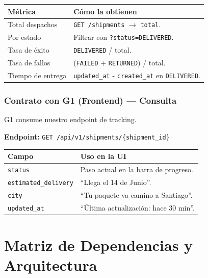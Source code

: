 \documentclass[11pt, a4paper]{article}
\begin{document}
\begin{table}[h!]
\centering
\renewcommand{\arraystretch}{1.3}
\begin{tabularx}{\textwidth}{l X}
  \toprule
  \textbf{Métrica} & \textbf{Cómo la obtienen} \\
  \midrule
  Total despachos       & \texttt{GET /shipments} $\rightarrow$ \texttt{total}. \\
  Por estado            & Filtrar con \texttt{?status=DELIVERED}. \\
  Tasa de éxito         & \texttt{DELIVERED} / total. \\
  Tasa de fallos        & (\texttt{FAILED} + \texttt{RETURNED}) / total. \\
  Tiempo de entrega     & \texttt{updated\_at} - \texttt{created\_at} en \texttt{DELIVERED}. \\
  \bottomrule
\end{tabularx}
\end{table}


\section{Contrato con G1 (Frontend) --- Consulta}

G1 consume nuestro endpoint de tracking.

\textbf{Endpoint:} \texttt{GET /api/v1/shipments/\{shipment\_id\}}

\begin{table}[h!]
\centering
\renewcommand{\arraystretch}{1.3}
\begin{tabularx}{\textwidth}{l X}
  \toprule
  \textbf{Campo} & \textbf{Uso en la UI} \\
  \midrule
  \texttt{status}              & Paso actual en la barra de progreso. \\
  \texttt{estimated\_delivery} & ``Llega el 14 de Junio''. \\
  \texttt{city}                & ``Tu paquete va camino a Santiago''. \\
  \texttt{updated\_at}         & ``Última actualización: hace 30 min''. \\
  \bottomrule
\end{tabularx}
\end{table}


\newpage
\part{Matriz de Dependencias y Arquitectura}
\end{document}
